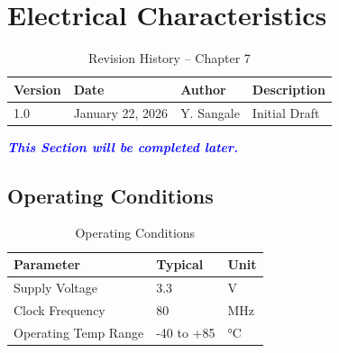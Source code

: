 \chapter{Electrical Characteristics}

\begin{table}[H]
\caption{Revision History – Chapter 7}
\centering
\begin{tabular}{llll}
\toprule
Version & Date & Author & Description \\
\midrule
1.0 & January 22, 2026 & Y. Sangale & Initial Draft \\
\bottomrule
\end{tabular}
\end{table}

\textcolor{blue}{\textbf{\textit{This Section will be completed later.}}}

\section{Operating Conditions}
\begin{table}[H]
\centering
\caption{Operating Conditions}
\begin{tabular}{lll}
\toprule
Parameter & Typical & Unit \\
\midrule
Supply Voltage & 3.3 & V \\
Clock Frequency & 80 & MHz \\
Operating Temp Range & -40 to +85 & °C \\
\bottomrule
\end{tabular}
\end{table}
